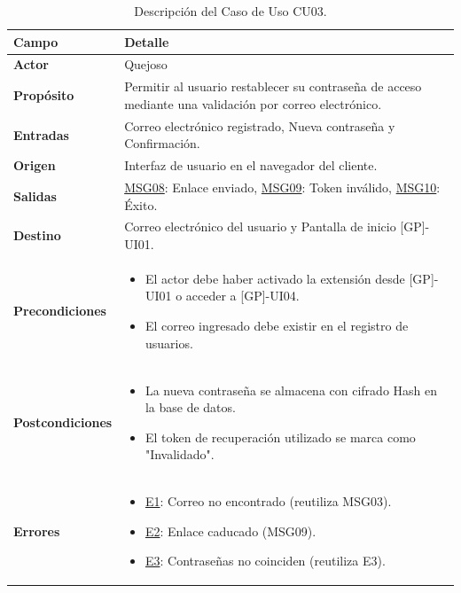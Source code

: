 \begin{appendices}
\begin{table}[htbp]
\centering
\small
\begin{tabular}{|p{3.5cm}|p{10.5cm}|}
\hline
\rowcolor[HTML]{EFEFEF} 
\textbf{Campo} & \textbf{Detalle} \\ \hline
\textbf{Actor} & Quejoso \\ \hline
\textbf{Propósito} & Permitir al usuario restablecer su contraseña de acceso mediante una validación por correo electrónico. \\ \hline
\textbf{Entradas} & Correo electrónico registrado, Nueva contraseña y Confirmación. \\ \hline
\textbf{Origen} & Interfaz de usuario en el navegador del cliente. \\ \hline
\textbf{Salidas} & \hyperlink{msg:MSG08}{MSG08}: Enlace enviado, \hyperlink{msg:MSG09}{MSG09}: Token inválido, \hyperlink{msg:MSG10}{MSG10}: Éxito. \\ \hline
\textbf{Destino} & Correo electrónico del usuario y Pantalla de inicio [GP]-UI01. \\ \hline
\textbf{Precondiciones} & 
\begin{itemize}[nosep, leftmargin=*]
    \item El actor debe haber activado la extensión desde [GP]-UI01 o acceder a [GP]-UI04.
    \item El correo ingresado debe existir en el registro de usuarios.
\end{itemize} \\ \hline
\textbf{Postcondiciones} & 
\begin{itemize}[nosep, leftmargin=*]
    \item La nueva contraseña se almacena con cifrado Hash en la base de datos.
    \item El token de recuperación utilizado se marca como "Invalidado".
\end{itemize} \\ \hline
\textbf{Errores} & 
\begin{itemize}[nosep, leftmargin=*]
    \item \hyperlink{msg:MSG03}{E1}: Correo no encontrado (reutiliza MSG03).
    \item \hyperlink{err:E6}{E2}: Enlace caducado (MSG09).
    \item \hyperlink{err:E3}{E3}: Contraseñas no coinciden (reutiliza E3).
\end{itemize} \\ \hline
\end{tabular}
\caption{Descripción del Caso de Uso CU03.}
\label{tab:cu03_especificacion}
\end{table}


\end{appendices}
